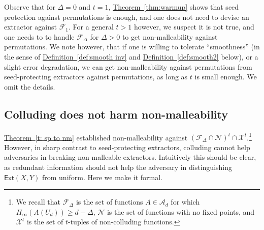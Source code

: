 \documentclass[11pt]{article}
\numberwithin{equation}{section}
\theoremstyle{definition}
\theoremstyle{plain}
\newcommand{\expref}[2]{\hyperref[#2]{#1~\ref{#2}}}
\newcommand{\ext}{\mathsf{Ext}}
\newcommand{\advfam}{\mathcal{A}}
\newcommand{\nc}{\mathcal{X}}
\newcommand{\me}{{H_{\infty}}}
\newcommand{\advfampart}{\mathcal{F}}
\newcommand{\nofp}{\mathcal{N}}
\begin{document}
Observe that for $\Delta = 0$ and $t = 1$, \expref{Theorem}{thm:warmup} shows that seed protection against
permutations is enough, and one does not need to devise an extractor against $\mathcal{F}_1$.
For a general $t > 1$ however, we suspect it is not true, and one needs to to handle $\mathcal{F}_\Delta$
for $\Delta > 0$ to get non-malleability against permutations. We note however, that if one is willing
to tolerate ``smoothness'' (in the sense of \expref{Definition}{def:smooth inv} and \expref{Definition}{def:smooth2} below), or a slight
error degradation, we can get non-malleability against permutations from seed-protecting extractors
against permutations, as long as $t$ is small enough. We omit the details.

\subsection{Colluding does not harm non-malleability}\label{sec:no nc}

\expref{Theorem}{t: sp to nm} established non-malleability against $\left(\advfampart_{\Delta} \cap \nofp\right)^t \cap \nc^t$.\footnote{We recall that $\mathcal{F}_{\Delta}$ is the set of functions $A \in \advfam_d$ for which $\me(A(U_d)) \ge d-\Delta$, $\nofp$ is the set of functions with no fixed points, and $\nc^t$ is
the set of $t$-tuples of non-colluding functions.}
However, in sharp contrast to seed-protecting extractors, colluding cannot help
adversaries in breaking non-malleable extractors. Intuitively this should be clear, as
redundant information should not help the adversary in distinguishing $\ext(X,Y)$
from uniform. Here we make it formal.
\end{document}
